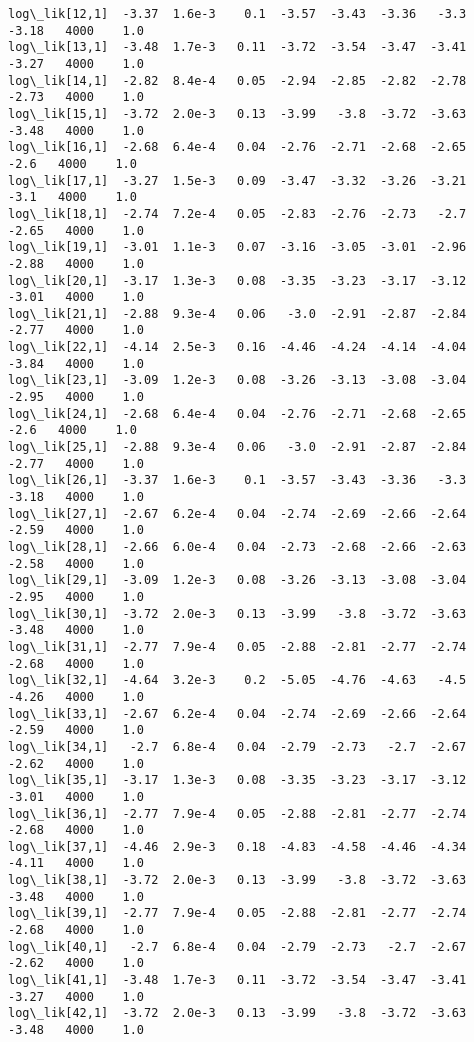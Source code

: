 \documentclass[11pt]{article}
\begin{document}
\begin{Verbatim}[commandchars=\\\{\}]
log\_lik[12,1]  -3.37  1.6e-3    0.1  -3.57  -3.43  -3.36   -3.3  -3.18   4000    1.0
log\_lik[13,1]  -3.48  1.7e-3   0.11  -3.72  -3.54  -3.47  -3.41  -3.27   4000    1.0
log\_lik[14,1]  -2.82  8.4e-4   0.05  -2.94  -2.85  -2.82  -2.78  -2.73   4000    1.0
log\_lik[15,1]  -3.72  2.0e-3   0.13  -3.99   -3.8  -3.72  -3.63  -3.48   4000    1.0
log\_lik[16,1]  -2.68  6.4e-4   0.04  -2.76  -2.71  -2.68  -2.65   -2.6   4000    1.0
log\_lik[17,1]  -3.27  1.5e-3   0.09  -3.47  -3.32  -3.26  -3.21   -3.1   4000    1.0
log\_lik[18,1]  -2.74  7.2e-4   0.05  -2.83  -2.76  -2.73   -2.7  -2.65   4000    1.0
log\_lik[19,1]  -3.01  1.1e-3   0.07  -3.16  -3.05  -3.01  -2.96  -2.88   4000    1.0
log\_lik[20,1]  -3.17  1.3e-3   0.08  -3.35  -3.23  -3.17  -3.12  -3.01   4000    1.0
log\_lik[21,1]  -2.88  9.3e-4   0.06   -3.0  -2.91  -2.87  -2.84  -2.77   4000    1.0
log\_lik[22,1]  -4.14  2.5e-3   0.16  -4.46  -4.24  -4.14  -4.04  -3.84   4000    1.0
log\_lik[23,1]  -3.09  1.2e-3   0.08  -3.26  -3.13  -3.08  -3.04  -2.95   4000    1.0
log\_lik[24,1]  -2.68  6.4e-4   0.04  -2.76  -2.71  -2.68  -2.65   -2.6   4000    1.0
log\_lik[25,1]  -2.88  9.3e-4   0.06   -3.0  -2.91  -2.87  -2.84  -2.77   4000    1.0
log\_lik[26,1]  -3.37  1.6e-3    0.1  -3.57  -3.43  -3.36   -3.3  -3.18   4000    1.0
log\_lik[27,1]  -2.67  6.2e-4   0.04  -2.74  -2.69  -2.66  -2.64  -2.59   4000    1.0
log\_lik[28,1]  -2.66  6.0e-4   0.04  -2.73  -2.68  -2.66  -2.63  -2.58   4000    1.0
log\_lik[29,1]  -3.09  1.2e-3   0.08  -3.26  -3.13  -3.08  -3.04  -2.95   4000    1.0
log\_lik[30,1]  -3.72  2.0e-3   0.13  -3.99   -3.8  -3.72  -3.63  -3.48   4000    1.0
log\_lik[31,1]  -2.77  7.9e-4   0.05  -2.88  -2.81  -2.77  -2.74  -2.68   4000    1.0
log\_lik[32,1]  -4.64  3.2e-3    0.2  -5.05  -4.76  -4.63   -4.5  -4.26   4000    1.0
log\_lik[33,1]  -2.67  6.2e-4   0.04  -2.74  -2.69  -2.66  -2.64  -2.59   4000    1.0
log\_lik[34,1]   -2.7  6.8e-4   0.04  -2.79  -2.73   -2.7  -2.67  -2.62   4000    1.0
log\_lik[35,1]  -3.17  1.3e-3   0.08  -3.35  -3.23  -3.17  -3.12  -3.01   4000    1.0
log\_lik[36,1]  -2.77  7.9e-4   0.05  -2.88  -2.81  -2.77  -2.74  -2.68   4000    1.0
log\_lik[37,1]  -4.46  2.9e-3   0.18  -4.83  -4.58  -4.46  -4.34  -4.11   4000    1.0
log\_lik[38,1]  -3.72  2.0e-3   0.13  -3.99   -3.8  -3.72  -3.63  -3.48   4000    1.0
log\_lik[39,1]  -2.77  7.9e-4   0.05  -2.88  -2.81  -2.77  -2.74  -2.68   4000    1.0
log\_lik[40,1]   -2.7  6.8e-4   0.04  -2.79  -2.73   -2.7  -2.67  -2.62   4000    1.0
log\_lik[41,1]  -3.48  1.7e-3   0.11  -3.72  -3.54  -3.47  -3.41  -3.27   4000    1.0
log\_lik[42,1]  -3.72  2.0e-3   0.13  -3.99   -3.8  -3.72  -3.63  -3.48   4000    1.0

\end{Verbatim}
\end{document}
